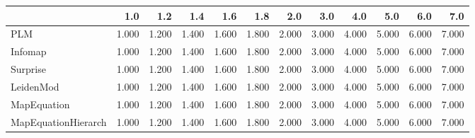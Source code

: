 \begin{tabular}{lrrrrrrrrrrr}
\toprule
{} &   1.0 &   1.2 &   1.4 &   1.6 &   1.8 &   2.0 &   3.0 &   4.0 &   5.0 &   6.0 &   7.0 \\
\midrule
PLM                 & 1.000 & 1.200 & 1.400 & 1.600 & 1.800 & 2.000 & 3.000 & 4.000 & 5.000 & 6.000 & 7.000 \\
Infomap             & 1.000 & 1.200 & 1.400 & 1.600 & 1.800 & 2.000 & 3.000 & 4.000 & 5.000 & 6.000 & 7.000 \\
Surprise            & 1.000 & 1.200 & 1.400 & 1.600 & 1.800 & 2.000 & 3.000 & 4.000 & 5.000 & 6.000 & 7.000 \\
LeidenMod           & 1.000 & 1.200 & 1.400 & 1.600 & 1.800 & 2.000 & 3.000 & 4.000 & 5.000 & 6.000 & 7.000 \\
MapEquation         & 1.000 & 1.200 & 1.400 & 1.600 & 1.800 & 2.000 & 3.000 & 4.000 & 5.000 & 6.000 & 7.000 \\
MapEquationHierarch & 1.000 & 1.200 & 1.400 & 1.600 & 1.800 & 2.000 & 3.000 & 4.000 & 5.000 & 6.000 & 7.000 \\
\bottomrule
\end{tabular}

